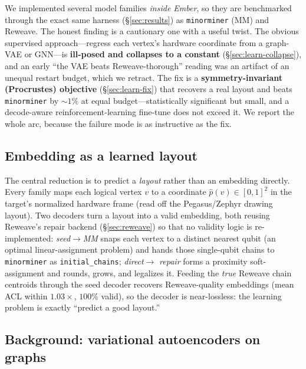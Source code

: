 \documentclass[acmsmall,anonymous,nonacm]{acmart}
\begin{document}
We implemented several model families \emph{inside Ember}, so they are benchmarked
through the exact same harness (\S\ref{sec:results}) as \texttt{minorminer} (MM) and
Reweave. The honest finding is a cautionary one with a useful twist. The obvious
supervised approach---regress each vertex's hardware coordinate from a graph-VAE or
GNN---is \textbf{ill-posed and collapses to a constant} (\S\ref{sec:learn-collapse}),
and an early ``the VAE beats Reweave-thorough'' reading was an artifact of an
unequal restart budget, which we retract. The fix is a \textbf{symmetry-invariant
(Procrustes) objective} (\S\ref{sec:learn-fix}) that recovers a real layout and beats
\texttt{minorminer} by ${\sim}1\%$ at equal budget---statistically significant but
small, and a decode-aware reinforcement-learning fine-tune does not exceed it. We
report the whole arc, because the failure mode is as instructive as the fix.

\subsection{Embedding as a learned layout}
\label{sec:learn-layout}

The central reduction is to predict a \emph{layout} rather than an embedding
directly. Every family maps each logical vertex $v$ to a coordinate
$\hat{p}(v)\in[0,1]^2$ in the target's normalized hardware frame (read off the
Pegasus/Zephyr drawing layout). Two decoders turn a layout into a valid embedding,
both reusing Reweave's repair backend (\S\ref{sec:reweave}) so that no
validity logic is re-implemented:
\emph{seed}$\rightarrow$\emph{MM} snaps each vertex to a distinct nearest qubit (an
optimal linear-assignment problem) and hands those single-qubit chains to
\texttt{minorminer} as \texttt{initial\_chains}; \emph{direct}$\rightarrow$%
\emph{repair} forms a proximity soft-assignment and rounds, grows, and legalizes it.
Feeding the \emph{true} Reweave chain centroids through the seed decoder recovers
Reweave-quality embeddings (mean ACL within $1.03\times$, $100\%$ valid), so the
decoder is near-lossless: the learning problem is exactly ``predict a good layout.''

\subsection{Background: variational autoencoders on graphs}
\end{document}
